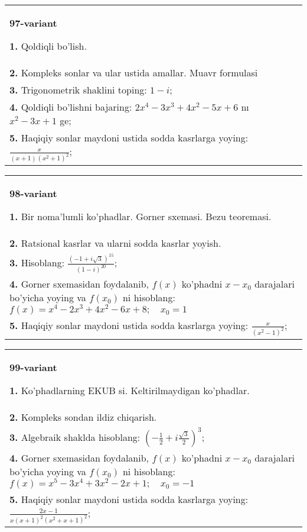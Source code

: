 \documentclass{article}
\begin{document}
\begin{tabular}{m{17cm}}
\textbf{97-variant}
\newline

\textbf{1.} Qoldiqli bo’lish.  \\
\textbf{2.} Kompleks sonlar va ular ustida amallar. Muavr formulasi  \\
\textbf{3.} Trigonometrik shaklini toping: $1-i$; \\
\textbf{4.} Qoldiqli bo’lishni bajaring: $2 x^4-3 x^3+4 x^2-5 x+6$ nı $x^2-3 x+1$ ge; \\
\textbf{5.} Haqiqiy sonlar maydoni ustida sodda kasrlarga yoying:  $\frac{x}{(x+1)\left(x^2+1\right)^2}$; \\

\end{tabular}
\vspace{1cm}


\begin{tabular}{m{17cm}}
\textbf{98-variant}
\newline

\textbf{1.} Bir noma’lumli ko’phadlar. Gorner sxemasi. Bezu teoremasi.  \\
\textbf{2.} Ratsional kasrlar va ularni sodda kasrlar yoyish. \\
\textbf{3.} Hisoblang:  $\frac{(-1+i \sqrt{3})^{15}}{(1-i)^{20}}$; \\
\textbf{4.} Gorner sxemasidan foydalanib, $f(x)$ ko’phadni $x-x_0$ darajalari bo’yicha yoying va $f\left(x_0\right)$ ni hisoblang: $f(x)=x^4-2 x^3+4 x^2-6 x+8 ; \quad x_0=1$ \\
\textbf{5.} Haqiqiy sonlar maydoni ustida sodda kasrlarga yoying:  $\frac{x}{\left(x^2-1\right)^2}$; \\

\end{tabular}
\vspace{1cm}


\begin{tabular}{m{17cm}}
\textbf{99-variant}
\newline

\textbf{1.} Ko’phadlarning EKUB si. Keltirilmaydigan ko’phadlar. \\
\textbf{2.} Kompleks sondan ildiz chiqarish. \\
\textbf{3.} Algebraik shaklda hisoblang:  $\left(-\frac{1}{2}+i \frac{\sqrt{3}}{2}\right)^3$; \\
\textbf{4.} Gorner sxemasidan foydalanib, $f(x)$ ko’phadni $x-x_0$ darajalari bo’yicha yoying va $f\left(x_0\right)$ ni hisoblang: $f(x)=x^5-3 x^4+3 x^2-2 x+1 ; \quad x_0=-1$ \\
\textbf{5.} Haqiqiy sonlar maydoni ustida sodda kasrlarga yoying:  $\frac{2 x-1}{x(x+1)^2\left(x^2+x+1\right)^2}$; \\

\end{tabular}
\vspace{1cm}
\end{document}

